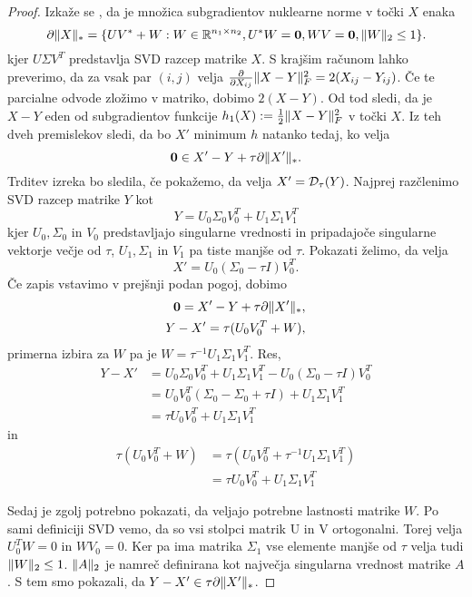 \begin{proof}
Izkaže se \cite{CCS}, da je množica subgradientov nuklearne norme v točki $X$ enaka
\[
    \partial\lVert X\rVert_* = \{UV^* + W: W \in \mathbb{R}^{n_1 \times n_2}, U^*W = \mathbf{0}, WV = \mathbf{0}, \lVert W\rVert_2 \leq 1 \}.
\]
kjer $U \Sigma V^T$ predstavlja SVD razcep matrike $X$. S krajšim računom lahko preverimo, da za vsak par $(i,j)$ velja $\frac{\partial}{\partial X_{ij}}\lVert X-Y\rVert_F^2 = 2(X_{ij} - Y_{ij})$. 
Če te parcialne odvode zložimo v matriko, dobimo $2(X-Y)$. Od tod sledi, da je $X-Y$ eden od subgradientov funkcije $h_1(X):=\frac{1}{2}\lVert X-Y\rVert_F^2$ v točki $X$.
Iz teh dveh premislekov sledi, da bo $X'$ minimum $h$ natanko tedaj, ko velja 
    $$\mathbf{0} \in X' - Y + \tau \partial\lVert X'\rVert_*.$$ 
Trditev izreka bo sledila, če pokažemo, da velja $X' = \mathcal{D}_\tau(Y)$. Najprej razčlenimo SVD razcep matrike $Y$ kot 
\[
    Y = U_0\Sigma_0V_0^T + U_1\Sigma_1V_1^T
\]
kjer $U_0, \Sigma_0$ in $V_0$ predstavljajo singularne vrednosti in pripadajoče singularne vektorje večje od $\tau$, $U_1, \Sigma_1$ in $V_1$ pa tiste manjše od $\tau$. Pokazati želimo, da velja 
\[
    X' = U_0(\Sigma_0 - \tau I)V_0^T.
\] 
Če zapis vstavimo v prejšnji podan pogoj, dobimo
\begin{align*}
    \mathbf{0} = X' - Y + \tau \partial \lVert X'\rVert_*,\\
    Y- X' = \tau (U_0 V_0^T + W),
\end{align*}
primerna izbira za $W$ pa je $W= \tau^{-1} U_1 \Sigma_1 V_1^T$. 
Res,
\begin{align*}
    Y-X' &= U_0\Sigma_0V_0^T + U_1\Sigma_1V_1^T - U_0(\Sigma_0 - \tau I)V_0^T \\ 
    &= U_0V_0^T(\Sigma_0 - \Sigma_0 + \tau I) + U_1\Sigma_1 V_1^T  \\
    &= \tau U_0 V_0^T + U_1\Sigma_1 V_1^T
\end{align*} 
in 
\begin{align*}
    \tau(U_0 V_0^T + W) &= \tau(U_0V_0^T + \tau^{-1} U_1 \Sigma_1 V_1^T)\\ 
    &= \tau U_0 V_0^T + U_1 \Sigma_1 V_1^T 
\end{align*}

Sedaj je zgolj potrebno pokazati, da veljajo potrebne lastnosti matrike $W$.
Po sami definiciji SVD vemo, da so vsi stolpci matrik U in V ortogonalni. Torej velja $U_0^TW = 0$ in $WV_0 = 0$. Ker pa ima matrika $\Sigma_1$ vse elemente manjše od $\tau$ velja tudi $\lVert W\rVert_2 \leq 1$. $\lVert A\rVert_2$ je namreč definirana kot največja singularna vrednost matrike $A$. S tem smo pokazali, da $Y - X' \in \tau \partial \lVert X'\rVert_*$.
\end{proof}
